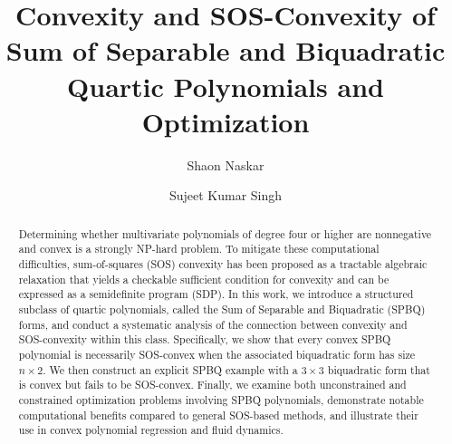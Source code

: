 \documentclass[12pt]{elsarticle}
\theoremstyle{definition}
\begin{document}
\begin{frontmatter}

\title{Convexity and SOS-Convexity of Sum of Separable and Biquadratic Quartic Polynomials and Optimization}

\author[label1]{Shaon Naskar}

\author[label1]{Sujeet Kumar Singh}


\address[label1]{Indian Statistical Institute, Hyderabad Unit, India, 500007}


\begin{abstract}
Determining whether multivariate polynomials of degree four or higher are nonnegative and convex is a strongly NP-hard problem. To mitigate these computational difficulties, sum-of-squares (SOS) convexity has been proposed as a tractable algebraic relaxation that yields a checkable sufficient condition for convexity and can be expressed as a semidefinite program (SDP). In this work, we introduce a structured subclass of quartic polynomials, called the Sum of Separable and Biquadratic (SPBQ) forms, and conduct a systematic analysis of the connection between convexity and SOS-convexity within this class. Specifically, we show that every convex SPBQ polynomial is necessarily SOS-convex when the associated biquadratic form has size $n \times 2$. We then construct an explicit SPBQ example with a $3 \times 3$ biquadratic form that is convex but fails to be SOS-convex. Finally, we examine both unconstrained and constrained optimization problems involving SPBQ polynomials, demonstrate notable computational benefits compared to general SOS-based methods, and illustrate their use in convex polynomial regression and fluid dynamics.
\end{abstract}


\begin{keyword}
\end{keyword}
\end{frontmatter}
\makeatletter
\def\ps@pprintTitle{%
 \let\@oddhead\@empty
 \let\@evenhead\@empty
 \def\@oddfoot{}%
 \let\@evenfoot\@oddfoot}
\makeatother
\end{document}
